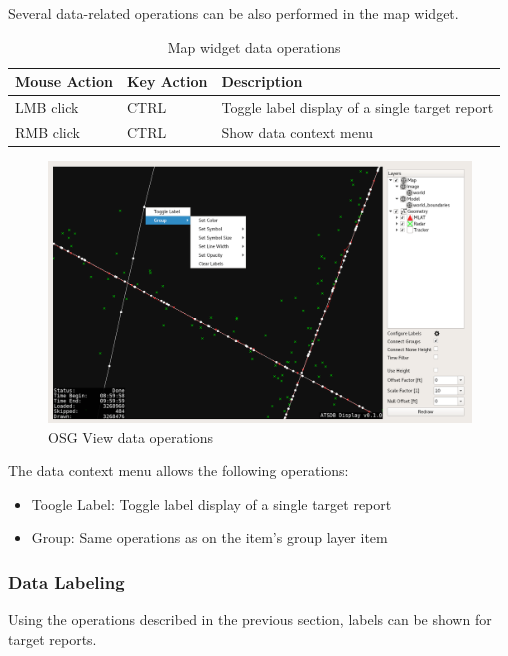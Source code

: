 {Several data-related operations can be also performed in the map widget.

\begin{table}[H]
  \center
  \begin{tabular}{ | l | l | l |}
    \hline
    \textbf{Mouse Action} & \textbf{Key Action} &  \textbf{Description} \\ \hline
    LMB click & CTRL & Toggle label display of a single target report \\ \hline
    RMB click & CTRL & Show data context menu \\ \hline
  \end{tabular}
  \caption{Map widget data operations}
\end{table}

\begin{figure}[H]
    \hspace*{-2cm}
    \includegraphics[width=18cm,frame]{../screenshots/osgview_data_operations.png}
  \caption{OSG View data operations}
\end{figure}

The data context menu allows the following operations:

\begin{itemize}
 \item Toogle Label: Toggle label display of a single target report
 \item Group: Same operations as on the item's group layer item
\end{itemize}

\subsubsection{Data Labeling}

Using the operations described in the previous section, labels can be shown for target reports.

}

